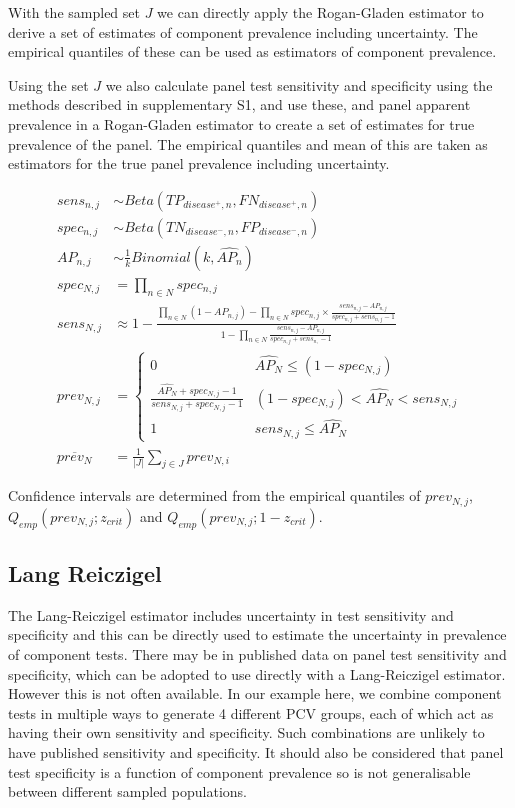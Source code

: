 \documentclass[a4paper, 12pt, twoside]{article}
\let\Oldsubsection\subsection
\renewcommand{\subsection}{\FloatBarrier\Oldsubsection}
\begin{document}
With the sampled set \(J\) we can directly apply the Rogan-Gladen estimator to derive a set of estimates of component prevalence including uncertainty. The empirical quantiles of these can be used as estimators of component prevalence.

Using the set \(J\) we also calculate panel test sensitivity and specificity using the methods described in supplementary S1, and use these, and panel apparent prevalence in a Rogan-Gladen estimator \cite{rogan1978} to create a set of estimates for true prevalence of the panel. The empirical quantiles and mean of this are taken as estimators for the true panel prevalence including uncertainty.

\begin{equation*}
\begin{aligned}
sens_{n,j} &\sim Beta(TP_{disease^+,n}, FN_{disease^+,n}) \\
spec_{n,j} &\sim Beta(TN_{disease^-,n}, FP_{disease^-,n}) \\
AP_{n,j} &\sim \frac{1}{k}Binomial(k, \widehat{AP_n}) \\
spec_{N,j} &= \prod_{n \in N}{spec_{n,j}} \\
sens_{N,j} &\approx 1-\frac{
  \prod_{n \in N}{(1-AP_{n,j})} - \prod_{n \in N}{spec_{n,j} \times \frac{sens_{n,j}-AP_{n,j}}{spec_{n,j} + sens_{n,j} - 1}}
}{
  1 - \prod_{n \in N}{ \frac{sens_{n,j}-AP_{n,j}}{spec_{n,j} + sens_{n,} - 1} }
} \\
prev_{N,j} &= \begin{cases}
    0 & \widehat{AP_N} \le (1-spec_{N,j})\\
    \frac{\widehat{AP_N} + spec_{N,j} -1}{sens_{N,j} + spec_{N,j} - 1} & (1-spec_{N,j}) < \widehat{AP_N} < sens_{N,j}\\
    1 & sens_{N,j} \le \widehat{AP_N}
  \end{cases} \\
\overline{prev_N} &= \frac{1}{|J|}\sum_{j \in J}{prev_{N,i}}
\end{aligned}
\end{equation*}

Confidence intervals are determined from the empirical quantiles of \(prev_{N,j}\), \(Q_{emp}(prev_{N,j};z_{crit})\) and \(Q_{emp}(prev_{N,j};1-z_{crit})\).

\subsection{Lang Reiczigel}

The Lang-Reiczigel estimator\cite{lang2014} includes uncertainty in test sensitivity and specificity and this can be directly used to estimate the uncertainty in prevalence of component tests. There may be in published data on panel test sensitivity and specificity, which can be adopted to use directly with a Lang-Reiczigel estimator. However this is not often available. In our example here, we combine component tests in multiple ways to generate 4 different PCV groups, each of which act as having their own sensitivity and specificity. Such combinations are unlikely to have published sensitivity and specificity. It should also be considered that panel test specificity is a function of component prevalence so is not generalisable between different sampled populations.
\end{document}
